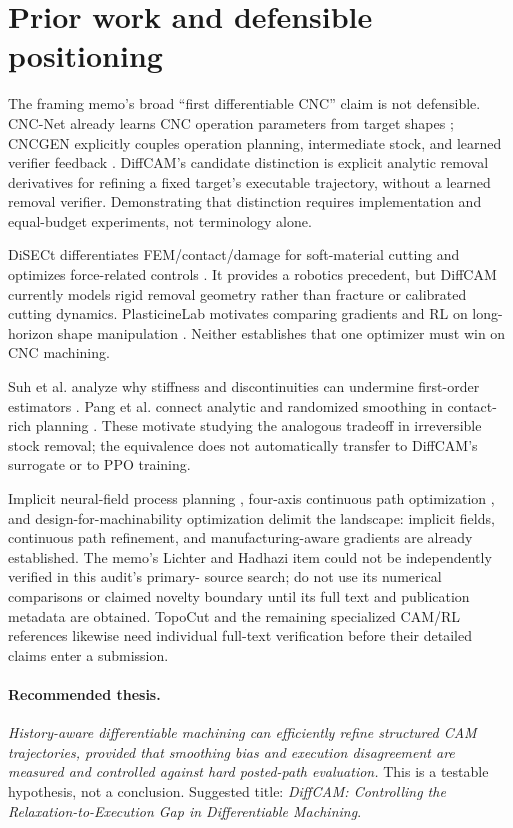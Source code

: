 \documentclass[11pt]{article}
\begin{document}
\section{Prior work and defensible positioning}
The framing memo's broad ``first differentiable CNC'' claim is not defensible.
CNC-Net already learns CNC operation parameters from target shapes
\cite{cncnet}; CNCGEN explicitly couples operation planning, intermediate stock,
and learned verifier feedback \cite{cncgen}. DiffCAM's candidate distinction is
explicit analytic removal derivatives for refining a fixed target's executable
trajectory, without a learned removal verifier. Demonstrating that distinction
requires implementation and equal-budget experiments, not terminology alone.

DiSECt differentiates FEM/contact/damage for soft-material cutting and optimizes
force-related controls \cite{disect}. It provides a robotics precedent, but
DiffCAM currently models rigid removal geometry rather than fracture or calibrated
cutting dynamics. PlasticineLab motivates comparing gradients and RL on
long-horizon shape manipulation \cite{plasticine}. Neither establishes that
one optimizer must win on CNC machining.

Suh et al. analyze why stiffness and discontinuities can undermine first-order
estimators \cite{suh}. Pang et al. connect analytic and randomized smoothing
in contact-rich planning \cite{pang}. These motivate studying the analogous
tradeoff in irreversible stock removal; the equivalence does not automatically
transfer to DiffCAM's surrogate or to PPO training.

Implicit neural-field process planning \cite{dutta}, four-axis continuous
path optimization \cite{zhang}, and design-for-machinability optimization
\cite{chen} delimit the landscape: implicit fields, continuous path refinement,
and manufacturing-aware gradients are already established. The memo's Lichter
and Hadhazi item could not be independently verified in this audit's primary-
source search; do not use its numerical comparisons or claimed novelty boundary
until its full text and publication metadata are obtained. TopoCut and the
remaining specialized CAM/RL references likewise need individual full-text
verification before their detailed claims enter a submission.

\paragraph{Recommended thesis.}
\emph{History-aware differentiable machining can efficiently refine structured
CAM trajectories, provided that smoothing bias and execution disagreement are
measured and controlled against hard posted-path evaluation.} This is a testable
hypothesis, not a conclusion. Suggested title: \emph{DiffCAM: Controlling the
Relaxation-to-Execution Gap in Differentiable Machining}.
\end{document}
